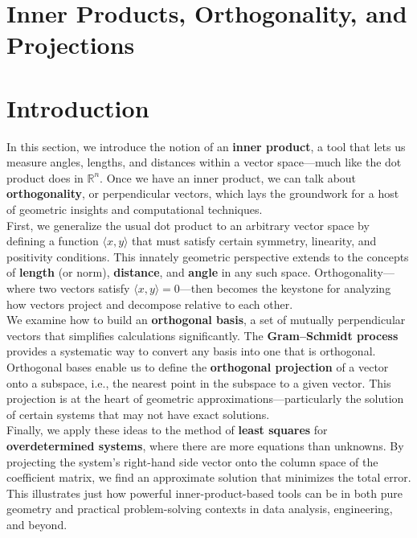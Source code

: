 \documentclass[a4paper, 9pt]{extarticle}
\begin{document}
\section{Inner Products, Orthogonality, and Projections}
\section*{Introduction}
\noindent In this section, we introduce the notion of an \textbf{inner product}, a tool that lets us measure angles, lengths, and distances within a vector space—much like the dot product does in $\mathbb{R}^n$. Once we have an inner product, we can talk about \textbf{orthogonality}, or perpendicular vectors, which lays the groundwork for a host of geometric insights and computational techniques. \\[2ex]

\noindent First, we generalize the usual dot product to an arbitrary vector space by defining a function $\langle x, y \rangle$ that must satisfy certain symmetry, linearity, and positivity conditions. This innately geometric perspective extends to the concepts of \textbf{length} (or norm), \textbf{distance}, and \textbf{angle} in any such space. Orthogonality—where two vectors satisfy $\langle x, y \rangle = 0$—then becomes the keystone for analyzing how vectors project and decompose relative to each other. \\[2ex]

\noindent We examine how to build an \textbf{orthogonal basis}, a set of mutually perpendicular vectors that simplifies calculations significantly. The \textbf{Gram–Schmidt process} provides a systematic way to convert any basis into one that is orthogonal. Orthogonal bases enable us to define the \textbf{orthogonal projection} of a vector onto a subspace, i.e., the nearest point in the subspace to a given vector. This projection is at the heart of geometric approximations—particularly the solution of certain systems that may not have exact solutions. \\[2ex]

\noindent Finally, we apply these ideas to the method of \textbf{least squares} for \textbf{overdetermined systems}, where there are more equations than unknowns. By projecting the system’s right-hand side vector onto the column space of the coefficient matrix, we find an approximate solution that minimizes the total error. This illustrates just how powerful inner-product-based tools can be in both pure geometry and practical problem-solving contexts in data analysis, engineering, and beyond.
\end{document}
